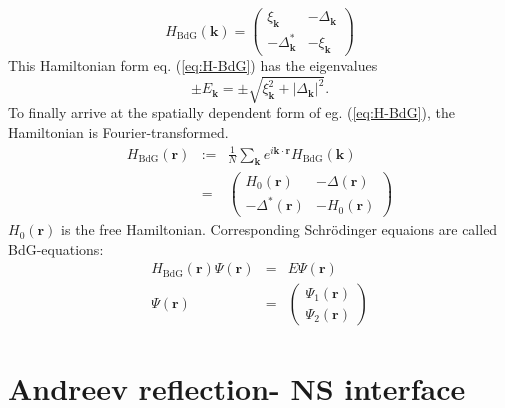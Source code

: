 \begin{equation}
H_\text{BdG}\left(\mathbf{k} \right) = \begin{pmatrix}
\xi_\mathbf{k} &  - \Delta_\mathbf{k}\\
- \Delta^*_\mathbf{k} & - \xi_\mathbf{k}
\end{pmatrix} \label{eq:H-BdG}
\end{equation}
This Hamiltonian form eq. (\ref{eq:H-BdG}) has the eigenvalues
\begin{equation}
 \pm E_\mathbf{k} = \pm \sqrt{\xi_\mathbf{k}^2 + |\Delta_\mathbf{k}|^2  }.
\end{equation}
To finally arrive at the spatially dependent form of eg. (\ref{eq:H-BdG}), the Hamiltonian is Fourier-transformed.
\begin{eqnarray}
H_\text{BdG} \left( \mathbf{r} \right) &:=& \frac{1}{N} \sum_\mathbf{k} e^{i \mathbf{k \cdot r}} H_\text{BdG}\left( \mathbf{k} \right) \\
&=& \begin{pmatrix}
H_0\left( \mathbf{r} \right)  &  - \Delta \left( \mathbf{r} \right) \\
- \Delta^* \left( \mathbf{r} \right)  & - H_0 \left( \mathbf{r} \right) 
\end{pmatrix} \label{eq:H-BdG-r}
\end{eqnarray}
$H_0 \left( \mathbf{r} \right) $ is the free Hamiltonian. Corresponding Schr\"odinger equaions are called BdG-equations:
\begin{eqnarray}
H_\text{BdG} \left( \mathbf{r} \right) \Psi\left( \mathbf{r} \right) &=& E \Psi\left( \mathbf{r} \right)\label{eq:BdG-eq} \\
\Psi\left( \mathbf{r} \right)  &=& \begin{pmatrix}
\Psi_1\left( \mathbf{r} \right) \\ \Psi_2\left( \mathbf{r} \right) 
\end{pmatrix}\label{eq:BdG-spinor}
\end{eqnarray}

\section{Andreev reflection- NS interface}\label{sec:NS}


